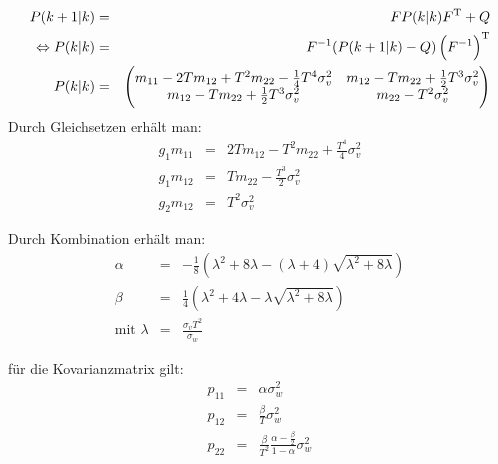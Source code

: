 \begin{eqnarray*}
    P(k+1|k) &=& F P(k|k) F^\text{T} + Q \\
    \Leftrightarrow P(k|k) &=& F^{-1} (P(k+1|k) - Q) \left(F^{-1}\right)^\text{T} \\
    P(k|k) &=&
        \begin{pmatrix}
            m_{11} - 2 T m_{12} + T^2 m_{22} - \frac{1}{4} T^4 \sigma_v^2 & m_{12} - T m_{22} + \frac{1}{2} T^3 \sigma_v^2 \\
            m_{12} - T m_{22} + \frac{1}{2} T^3 \sigma_v^2 & m_{22} - T^2 \sigma_v^2
        \end{pmatrix}
\end{eqnarray*}
Durch Gleichsetzen erhält man:
\begin{eqnarray*}
    g_1 m_{11} &=& 2 T m_{12} - T^2 m_{22} + \frac{T^4}{4} \sigma_v^2 \\
    g_1 m_{12} &=& T m_{22} - \frac{T^3}{2} \sigma_v^2 \\
    g_2 m_{12} &=& T^2 \sigma_v^2
\end{eqnarray*} 

Durch Kombination erhält man:
\begin{eqnarray*}
    \alpha &=& - \frac{1}{8} \left( \lambda^2 + 8 \lambda - (\lambda + 4) \sqrt{\lambda^2 + 8 \lambda} \right) \\
    \beta &=& \frac{1}{4} \left( \lambda^2 + 4\lambda - \lambda \sqrt{\lambda^2 + 8 \lambda} \right) \\
    \text{mit } \lambda &=& \frac{\sigma_v T^2}{\sigma_w} 
\end{eqnarray*}

für die Kovarianzmatrix gilt:
\begin{eqnarray*}
    p_{11} &=& \alpha \sigma_w^2 \\
    p_{12} &=& \frac{\beta}{T} \sigma_w^2 \\
    p_{22} &=& \frac{\beta}{T^2} \frac{\alpha-\frac{\beta}{2}}{1-\alpha} \sigma_w^2
\end{eqnarray*}

